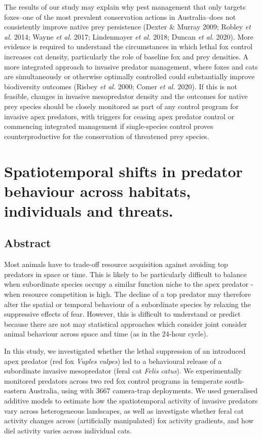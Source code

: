 \documentclass[11pt,a4paper,titlepage,twoside,openright]{style/unimelbthesis}
\begin{document}
\begin{mainmatter}
The results of our study may explain why pest management that only targets foxes--one of the most prevalent conservation actions in Australia--does not consistently improve native prey persistence (Dexter \& Murray 2009; Robley \emph{et al.} 2014; Wayne \emph{et al.} 2017; Lindenmayer \emph{et al.} 2018; Duncan \emph{et al.} 2020). More evidence is required to understand the circumstances in which lethal fox control increases cat density, particularly the role of baseline fox and prey densities. A more integrated approach to invasive predator management, where foxes and cats are simultaneously or otherwise optimally controlled could substantially improve biodiversity outcomes (Risbey \emph{et al.} 2000; Comer \emph{et al.} 2020). If this is not feasible, changes in invasive mesopredator density and the outcomes for native prey species should be closely monitored as part of any control program for invasive apex predators, with triggers for ceasing apex predator control or commencing integrated management if single-species control proves counterproductive for the conservation of threatened prey species.

\hypertarget{diel}{%
\chapter{Spatiotemporal shifts in predator behaviour across habitats, individuals and threats.}\label{diel}}

\hypertarget{abstract-3}{%
\section*{Abstract}\label{abstract-3}}

Most animals have to trade-off resource acquisition against avoiding top predators in space or time. This is likely to be particularly difficult to balance when subordinate species occupy a similar function niche to the apex predator - when resource competition is high. The decline of a top predator may therefore alter the spatial or temporal behaviour of a subordinate species by relaxing the suppressive effects of fear. However, this is difficult to understand or predict because there are not may statistical approaches which consider joint consider animal behaviour across space and time (as in the 24-hour cycle).

In this study, we investigated whether the lethal suppression of an introduced apex predator (red fox \emph{Vuples vulpes}) led to a behavioural release of a subordinate invasive mesopredator (feral cat \emph{Felis catus}). We experimentally monitored predators across two red fox control programs in temperate south-eastern Australia, using with 3667 camera-trap deployments. We used generalised additive models to estimate how the spatiotemporal activity of invasive predators vary across heterogeneous landscapes, as well as investigate whether feral cat activity changes across (artificially manipulated) fox activity gradients, and how diel activity varies across individual cats.


\end{mainmatter}
\end{document}
